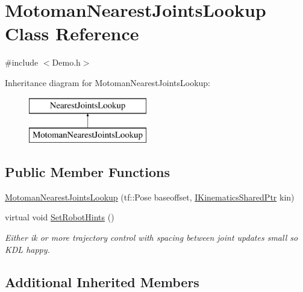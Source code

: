 \hypertarget{classMotomanNearestJointsLookup}{\section{Motoman\-Nearest\-Joints\-Lookup Class Reference}
\label{classMotomanNearestJointsLookup}
}


{\ttfamily \#include $<$Demo.\-h$>$}

Inheritance diagram for Motoman\-Nearest\-Joints\-Lookup\-:\begin{figure}[H]
\begin{center}
\leavevmode
\includegraphics[height=2.000000cm]{classMotomanNearestJointsLookup}
\end{center}
\end{figure}
\subsection*{Public Member Functions}
\begin{DoxyCompactItemize}
\item 
\hyperlink{classMotomanNearestJointsLookup_a98735da0485f02fb789297aefbe3c367}{Motoman\-Nearest\-Joints\-Lookup} (tf\-::\-Pose baseoffset, \hyperlink{Kinematics_8h_aa720b9842c846588baf215581fb9f902}{I\-Kinematics\-Shared\-Ptr} kin)
\item 
virtual void \hyperlink{classMotomanNearestJointsLookup_a4eb36439bed74cecca93decece53d9ff}{Set\-Robot\-Hints} ()
\begin{DoxyCompactList}\small\item\em Either ik or more trajectory control with spacing between joint updates small so K\-D\-L happy. \end{DoxyCompactList}\end{DoxyCompactItemize}
\subsection*{Additional Inherited Members}


